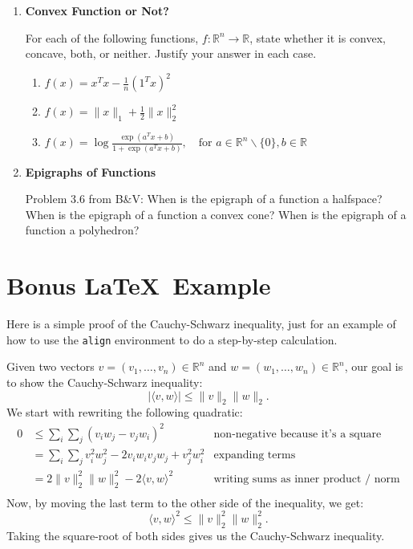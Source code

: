 \documentclass[11pt]{article}
\begin{document}
\begin{enumerate}
\begin{enumerate}
  \item Let $f : \mathbb{R}^n \rightarrow \mathbb{R}$ be a convex function. Show that for any
    $x_1, \ldots, x_k \in \mathbb{R}^n$ and any $\theta_1 > 0,$ and $\theta_2, \ldots, \theta_k \leq 0$,
    with $\theta_1 + \cdots + \theta_k = 1,$
    $$f(\theta_1 x_1 + \cdots + \theta_k x_k) \geq \theta_1 f(x_1) + \cdots + \theta_k f(x_k).$$
    ({\bf Careful:} Pay close attention to the direction of the various inequality signs!)

\end{enumerate}

\item {\bf Convex Function or Not?}

For each of the following functions, $f : \mathbb{R}^n \rightarrow \mathbb{R}$,
state whether it is convex, concave, both, or neither. Justify your answer in
each case.
\begin{enumerate}
\item $f(x) = x^T x - \frac{1}{n} (1^T x)^2$
\item $f(x) = \|x\|_1 + \frac{1}{2} \|x\|_2^2$
\item
$f(x) = \log \frac{\exp(a^T x + b)}{1 + \exp(a^T x + b)}, \quad \text{for $a \in \mathbb{R}^n \backslash \{0\}, b \in \mathbb{R}$}$
\end{enumerate}

\item {\bf Epigraphs of Functions}

Problem 3.6 from B\&V: When is the epigraph of a function a halfspace? When is the
epigraph of a function a convex cone? When is the epigraph of a function a polyhedron?

\end{enumerate}

\section*{Bonus \LaTeX \ Example}
Here is a simple proof of the Cauchy-Schwarz inequality, just for an example of
how to use the {\tt align} environment to do a step-by-step calculation.

Given two vectors $v = (v_1, \ldots, v_n) \in \mathbb{R}^n$ and $w = (w_1,
\ldots, w_n) \in \mathbb{R}^n$, our goal is to show the Cauchy-Schwarz
inequality:
$$|\langle v, w \rangle| \leq \|v\|_2 \|w\|_2.$$
We start with rewriting the following quadratic:
\begin{align*}
  0 & \leq \sum_i \sum_j (v_i w_j - v_j w_i)^2 & \text{non-negative because it's a square}\\
    & = \sum_i \sum_j v_i^2 w_j^2 - 2 v_i w_i v_j w_j + v_j^2 w_i^2 & \text{expanding terms}\\
    & = 2 \|v\|_2^2 \|w\|_2^2 - 2\langle v, w \rangle^2 & \text{writing sums as inner product / norm}\\
\end{align*}
Now, by moving the last term to the other side of the inequality, we get:
$$\langle v, w \rangle^2 \leq \|v\|_2^2 \|w\|_2^2.$$
Taking the square-root of both sides gives us the Cauchy-Schwarz inequality.
\end{document}
